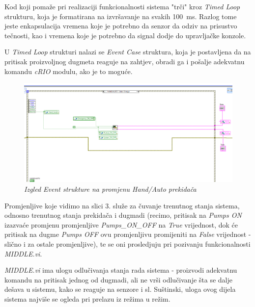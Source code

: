 \documentclass[12pt, titlepage]{article}
\begin{document}
            Kod koji pomaže pri realizaciji funkcionalnosti sistema "trči" kroz \textit{Timed Loop} strukturu,
            koja je formatirana na izvršavanje na svakih \SI{100}{\ms}. Razlog tome jeste enkapsulacija vremena
            koje je potrebno da senzor da odziv na prisustvo tečnosti, kao i vremena koje je potrebno da 
            signal dodje do upravljačke konzole.
            
            U \textit{Timed Loop} strukturi nalazi se \textit{Event Case} struktura, koja je postavljena 
            da na pritisak proizvoljnog dugmeta reaguje na zahtjev, obradi ga i pošalje adekvatnu 
            komandu \textit{cRIO} modulu, ako je to moguće.

            \begin{figure}[ht]
                \centering
                \includegraphics[width=\textwidth]{Slike/SCADA.vi HAND-AUTO CASE.png}
                \caption{\textit{Izgled Event strukture na promjenu Hand/Auto prekidača}}
            \end{figure}

            Promjenljive koje vidimo na slici 3. služe za čuvanje trenutnog stanja sistema, 
            odnosno trenutnog stanja prekidača i dugmadi (recimo, pritisak na \textit{Pumps ON}
            izazvaće promjenu promjenljive \textit{Pumps\_ON\_OFF} na \textit{True} vrijednost,
            dok će pritisak na dugme \textit{Pumps OFF} ovu promjenljivu promijeniti na \textit{False}
            vrijednost - slično i za ostale promjenljive), te se oni prosledjuju pri pozivanju funkcionalnosti \textit{MIDDLE.vi}. 

            \textit{MIDDLE.vi} ima ulogu odlučivanja stanja rada sistema - proizvodi adekvatnu komandu
            na pritisak jednog od dugmadi, ali ne vrši odlučivanje šta se dalje dešava u sistemu, kako se 
            reaguje na senzore i sl. Suštinski, uloga ovog dijela sistema najviše se ogleda
            pri prelazu iz režima u režim.
\end{document}
